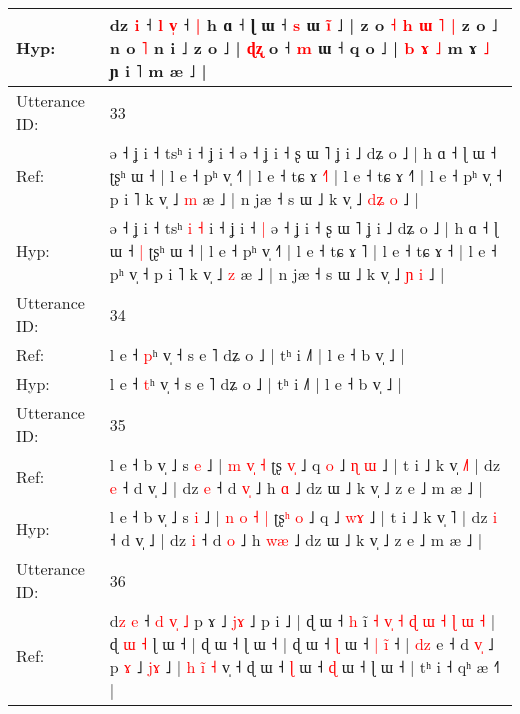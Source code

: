 \documentclass[10pt]{article}
\DeclareRobustCommand{\hl}[1]{{\textcolor{red}{#1}}}
\begin{document}
\begin{longtable}{ll}
 \\
Hyp: & dz \hl{i} ˧ \hl{l} \hl{v}\hl{̩} ˧\hl{ }\hl{|} h ɑ ˧ ɭ ɯ ˧ \hl{}\hl{}\hl{s} ɯ\hl{}\hl{} \hl{}\hl{}\hl{i}\hl{̃} ˩ | z o\hl{ }\hl{˧} \hl{h} \hl{ɯ} \hl{˥} \hl{|} z o ˩ n o \hl{˥} n i ˩ z o ˩ | \hl{ɖ}\hl{ʐ} o ˧ \hl{m} ɯ ˧ q o ˩ |\hl{}\hl{}\hl{}\hl{}\hl{}\hl{}\hl{} \hl{b} \hl{}\hl{ɤ} \hl{˩} m ɤ \hl{˩} ɲ i ˥ m æ ˩ |
 \\
\midrule
Utterance ID: & 33 \\
Ref: & ə ˧ ʝ i ˧ tsʰ\hl{}\hl{}\hl{}\hl{} i ˧ ʝ i ˧\hl{}\hl{} ə ˧ ʝ i ˧ ʂ ɯ ˥ ʝ i ˩ dʑ o ˩ | h ɑ ˧ ɭ ɯ ˧\hl{}\hl{} ʈʂʰ ɯ ˧ | l e ˧ pʰ v̩ ˧˥ | l e ˧ tɕ ɤ \hl{˧}˥ | l e ˧ tɕ ɤ ˧\hl{˥} | l e ˧ pʰ v̩ ˧ p i ˥ k v̩ ˩ \hl{m} æ ˩ | n jæ ˧ s ɯ ˩ k v̩ ˩ \hl{d}\hl{ʑ} \hl{o} ˩ |
 \\
Hyp: & ə ˧ ʝ i ˧ tsʰ\hl{ }\hl{i}\hl{ }\hl{˧} i ˧ ʝ i ˧\hl{ }\hl{|} ə ˧ ʝ i ˧ ʂ ɯ ˥ ʝ i ˩ dʑ o ˩ | h ɑ ˧ ɭ ɯ ˧\hl{ }\hl{|} ʈʂʰ ɯ ˧ | l e ˧ pʰ v̩ ˧˥ | l e ˧ tɕ ɤ \hl{}˥ | l e ˧ tɕ ɤ ˧\hl{} | l e ˧ pʰ v̩ ˧ p i ˥ k v̩ ˩ \hl{z} æ ˩ | n jæ ˧ s ɯ ˩ k v̩ ˩ \hl{}\hl{ɲ} \hl{i} ˩ |
 \\
\midrule
Utterance ID: & 34 \\
Ref: & l e ˧ \hl{p}ʰ v̩ ˧ s e ˥ dʑ o ˩ | tʰ i ˩˥ | l e ˧ b v̩ ˩ |
 \\
Hyp: & l e ˧ \hl{t}ʰ v̩ ˧ s e ˥ dʑ o ˩ | tʰ i ˩˥ | l e ˧ b v̩ ˩ |
 \\
\midrule
Utterance ID: & 35 \\
Ref: & l e ˧ b v̩ ˩ s \hl{e} ˩ | \hl{m} \hl{}\hl{v}\hl{̩} \hl{˧} ʈʂ\hl{ }\hl{v}\hl{̩} ˩ q\hl{ }\hl{o} ˩ \hl{ɳ}\hl{ }\hl{ɯ} ˩ | t i ˩ k v̩ \hl{˩}˥ | dz \hl{e} ˧ d v̩ ˩ | dz \hl{e} ˧ d \hl{v}\hl{̩} ˩ h \hl{}\hl{ɑ} ˩ dz ɯ ˩ k v̩ ˩ z e ˩ m æ ˩ |
 \\
Hyp: & l e ˧ b v̩ ˩ s \hl{i} ˩ | \hl{n} \hl{o}\hl{ }\hl{˧} \hl{|} ʈʂ\hl{ʰ}\hl{ }\hl{o} ˩ q\hl{}\hl{} ˩ \hl{}\hl{w}\hl{ɤ} ˩ | t i ˩ k v̩ \hl{}˥ | dz \hl{i} ˧ d v̩ ˩ | dz \hl{i} ˧ d \hl{}\hl{o} ˩ h \hl{w}\hl{æ} ˩ dz ɯ ˩ k v̩ ˩ z e ˩ m æ ˩ |
 \\
\midrule
Utterance ID: & 36 \\
Ref: & d\hl{z} \hl{e} ˧ \hl{d} \hl{}\hl{v}\hl{̩} \hl{˩} p ɤ ˩\hl{}\hl{} \hl{j}\hl{ɤ} ˩ p i ˩ | ɖ ɯ ˧ \hl{h} i\hl{̃}\hl{ }\hl{˧}\hl{ }\hl{v}\hl{̩}\hl{ }\hl{˧}\hl{ }\hl{ɖ} \hl{ɯ} \hl{˧} \hl{ɭ}\hl{ }\hl{ɯ} \hl{˧} | ɖ\hl{ }\hl{ɯ}\hl{ }\hl{˧} ɭ ɯ ˧ | ɖ ɯ ˧ ɭ ɯ ˧ | ɖ ɯ ˧ \hl{ɭ} ɯ ˧ \hl{|} \hl{i}\hl{̃} ˧ | \hl{d}\hl{z} e ˧ d \hl{v}\hl{̩} ˩ p \hl{ɤ} ˩ \hl{j}\hl{ɤ} ˩ |\hl{ }\hl{h}\hl{ }\hl{i}\hl{̃} \hl{˧} v̩ ˧ ɖ ɯ ˧ \hl{ɭ} ɯ ˧ \hl{ɖ} ɯ ˧ ɭ ɯ ˧ | tʰ i ˧ qʰ æ ˧˥ |
 \\

\end{longtable}
\end{document}
